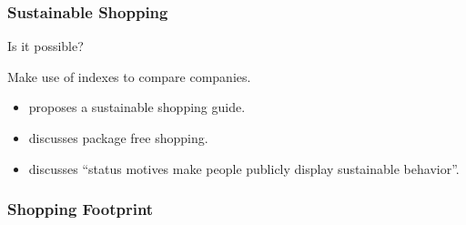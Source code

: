 \documentclass[
  letterpaper,
  DIV=11,
  numbers=noendperiod]{scrartcl}
\providecommand{\tightlist}{%
  \setlength{\itemsep}{0pt}\setlength{\parskip}{0pt}}\usepackage{longtable,booktabs,array}
\begin{document}
\subsubsection{Sustainable Shopping}\label{sustainable-shopping}

Is it possible?

Make use of indexes to compare companies.

\begin{itemize}
\tightlist
\item
  \citet{weberMobileAppsSustainable2021} proposes a sustainable shopping
  guide.
\item
  \citet{fuentesUnpackingPackageFree2019} discusses package free
  shopping.
\item
  \citet{vanderwalParadoxGreenBe2016} discusses ``status motives make
  people publicly display sustainable behavior''.
\end{itemize}

\subsubsection{Shopping Footprint}\label{shopping-footprint}
\end{document}
